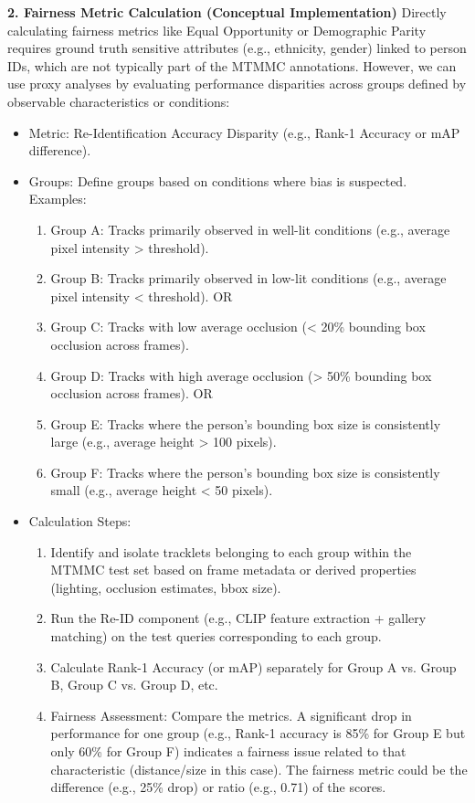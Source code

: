 \textbf{2. Fairness Metric Calculation (Conceptual Implementation)}
Directly calculating fairness metrics like Equal Opportunity or Demographic Parity requires ground truth sensitive attributes (e.g., ethnicity, gender) linked to person IDs, which are not typically part of the MTMMC annotations. However, we can use proxy analyses by evaluating performance disparities across groups defined by observable characteristics or conditions:
\begin{itemize}
    \item Metric: Re-Identification Accuracy Disparity (e.g., Rank-1 Accuracy or mAP difference).
    \item Groups: Define groups based on conditions where bias is suspected. Examples:
    \begin{enumerate}
        \item Group A: Tracks primarily observed in well-lit conditions (e.g., average pixel intensity > threshold).
        \item Group B: Tracks primarily observed in low-lit conditions (e.g., average pixel intensity < threshold).
        OR
        \item Group C: Tracks with low average occlusion (< 20\% bounding box occlusion across frames).
        \item Group D: Tracks with high average occlusion (> 50\% bounding box occlusion across frames).
        OR
        \item Group E: Tracks where the person's bounding box size is consistently large (e.g., average height > 100 pixels).
        \item Group F: Tracks where the person's bounding box size is consistently small (e.g., average height < 50 pixels).
    \end{enumerate}
    \item Calculation Steps:
    \begin{enumerate}
        \item Identify and isolate tracklets belonging to each group within the MTMMC test set based on frame metadata or derived properties (lighting, occlusion estimates, bbox size).
        \item Run the Re-ID component (e.g., CLIP feature extraction + gallery matching) on the test queries corresponding to each group.
        \item Calculate Rank-1 Accuracy (or mAP) separately for Group A vs. Group B, Group C vs. Group D, etc.
        \item Fairness Assessment: Compare the metrics. A significant drop in performance for one group (e.g., Rank-1 accuracy is 85\% for Group E but only 60\% for Group F) indicates a fairness issue related to that characteristic (distance/size in this case). The fairness metric could be the difference (e.g., 25\% drop) or ratio (e.g., 0.71) of the scores.
    \end{enumerate}
\end{itemize}

